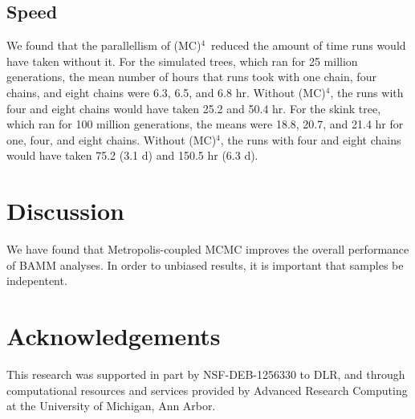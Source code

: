 \documentclass[12pt]{article}
\newcommand{\MCMCMCMC}{(MC)$^{4}$}
\begin{document}
\subsection*{Speed}

We found that the parallellism of \MCMCMCMC\ 
reduced the amount of time runs would have taken without it.
%
For the simulated trees, which ran for 25 million generations,
the mean number of hours that runs took with
one chain, four chains, and eight chains were
6.3, 6.5, and 6.8 hr.
%
Without \MCMCMCMC, the runs with four and eight chains
would have taken 25.2 and 50.4 hr.
%
For the skink tree, which ran for 100 million generations,
the means were 18.8, 20.7, and 21.4 hr for one, four, and eight chains.
%
Without \MCMCMCMC, the runs with four and eight chains
would have taken 75.2 (3.1 d) and 150.5 hr (6.3 d).


\section*{Discussion}

We have found that Metropolis-coupled MCMC improves
the overall performance of BAMM analyses.
%
In order to unbiased results,
it is important that samples be indepentent.


\section*{Acknowledgements}
This research was supported in part by 
NSF-DEB-1256330 to DLR, and through computational resources
and services provided by Advanced Research Computing
at the University of Michigan, Ann Arbor. 



\end{document}
